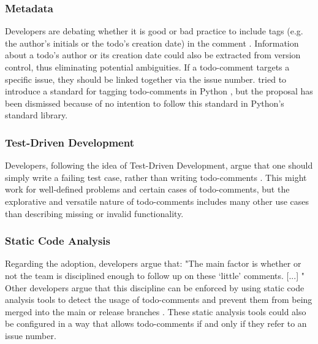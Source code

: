 \subsubsection{Metadata}
Developers are debating whether it is good or bad practice to include tags (e.g. the author's initials or the todo's creation date) in the comment \cite{karacic_todo_2015}.
Information about a todo's author or its creation date could also be extracted from version control, thus eliminating potential ambiguities.
If a todo-comment targets a specific issue, they should be linked together via the issue number.
\citeauthor{elliott_pep_2005} tried to introduce a standard for tagging todo-comments in Python \cite{elliott_pep_2005}, but the proposal has been dismissed because of no intention to follow this standard in Python's standard library.

\subsubsection{Test-Driven Development}
Developers, following the idea of Test-Driven Development, argue that one should simply write a failing test case, rather than writing todo-comments \cite{snoop_does_2016}.
This might work for well-defined problems and certain cases of todo-comments, but the explorative and versatile nature of todo-comments includes many other use cases than describing missing or invalid functionality.

\subsubsection{Static Code Analysis}
Regarding the adoption, developers argue that: "The main factor is whether or not the team is disciplined enough to follow up on these `little' comments. [...] \cite{karacic_todo_2015}"
Other developers argue that this discipline can be enforced by using static code analysis tools to detect the usage of todo-comments and prevent them from being merged into the main or release branches \cite{alecxe_how_2018}.
These static analysis tools could also be configured in a way that allows todo-comments if and only if they refer to an issue number.

